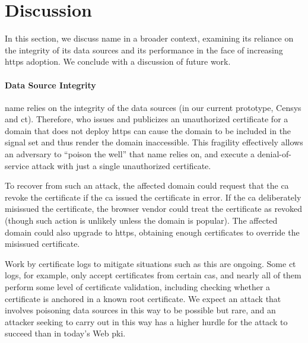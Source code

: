 \section{Discussion}
\label{sec:discussion}

In this section, we discuss \ac{name} in a broader context, examining its
reliance on the integrity of its data sources and its performance in
the face of increasing \ac{https} adoption. We conclude with a discussion of
future work.

\paragraph{Data Source Integrity}

\ac{name} relies on the integrity of the data sources (in our current prototype,
Censys and \ac{ct}). Therefore,  who issues
and publicizes an unauthorized certificate for a domain that does not deploy
\ac{https} can cause the domain to be included in the signal set and thus render
the domain inaccessible. This fragility effectively allows an adversary to
``poison the well'' that \ac{name} relies on, and execute a denial-of-service
attack with just a single unauthorized certificate.

To recover from such an attack, the
affected domain could request that the \ac{ca} revoke the certificate if the
\ac{ca} issued the certificate in error. If the \ac{ca} deliberately misissued
the certificate, the browser vendor could treat the certificate as revoked
(though such action is unlikely unless the domain is popular). The affected
domain could also upgrade to \ac{https}, obtaining enough certificates to
override the misissued certificate. 

Work by certificate logs to mitigate situations such as this are ongoing. Some
\ac{ct} logs, for example, only accept certificates from certain \acp{ca}, and
nearly all of them perform some level of certificate validation, including
checking whether a certificate is anchored in a known root certificate. We
expect an attack that involves poisoning data sources in this way to be possible
but rare, and an attacker seeking to carry out  in this way has a
higher hurdle for the attack to succeed than in today's Web \ac{pki}.

